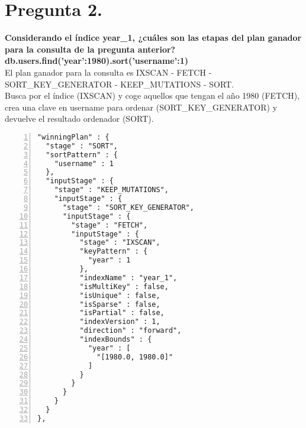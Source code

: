 \documentclass{article}
\begin{document}
  \section{Pregunta 2.}
  \textbf{Considerando el índice year\_1, ¿cuáles son las etapas del plan ganador para la consulta de la pregunta anterior? \\
  db.users.find({'year':1980}).sort({'username':1}) \\ }
    El plan ganador para la consulta es IXSCAN - FETCH - SORT\_KEY\_GENERATOR - KEEP\_MUTATIONS - SORT. \\
    Busca por el índice (IXSCAN) y coge aquellos que tengan el año 1980 (FETCH), crea una clave en username para ordenar (SORT\_KEY\_GENERATOR)
    y devuelve el resultado ordenador (SORT).
    \begin{lstlisting}[numbers=left,frame=single]
"winningPlan" : {
  "stage" : "SORT",
  "sortPattern" : {
    "username" : 1
  },
  "inputStage" : {
    "stage" : "KEEP_MUTATIONS",
    "inputStage" : {
      "stage" : "SORT_KEY_GENERATOR",
      "inputStage" : {
        "stage" : "FETCH",
        "inputStage" : {
          "stage" : "IXSCAN",
          "keyPattern" : {
            "year" : 1
          },
          "indexName" : "year_1",
          "isMultiKey" : false,
          "isUnique" : false,
          "isSparse" : false,
          "isPartial" : false,
          "indexVersion" : 1,
          "direction" : "forward",
          "indexBounds" : {
            "year" : [
              "[1980.0, 1980.0]"
            ]
          }
        }
      }
    }
  }
},
    \end{lstlisting}


  \newpage
\end{document}
